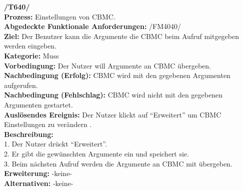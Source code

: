 \documentclass[a4paper]{scrreprt}
\begin{document}
\textbf{/T640/}\\
\textbf{Prozess:} Einstellungen von CBMC.\\
\textbf{Abgedeckte Funktionale Anforderungen:} /FM4040/ \\
\textbf{Ziel:} Der Benutzer kann die Argumente die CBMC beim Aufruf
mitgegeben werden eingeben.\\
\textbf{Kategorie:} Muss\\
\textbf{Vorbedingung:} Der Nutzer will Argumente an CBMC übergeben.\\
\textbf{Nachbedingung (Erfolg):} CBMC wird mit den gegebenen Argumenten
aufgerufen.\\
\textbf{Nachbedingung (Fehlschlag):} CBMC wird nicht mit den gegebenen
Argumenten gestartet.\\
\textbf{Auslösendes Ereignis:} Der Nutzer klickt auf "`Erweitert"' um CBMC Einstellungen zu verändern .\\
\textbf{Beschreibung:} \\
1. Der Nutzer drückt "`Erweitert"'.\\
2. Er gibt die gewünschten Argumente ein und speichert sie.\\
3. Beim nächsten Aufruf werden die Argumente an CBMC mit übergeben.\\
\textbf {Erweiterung:}  -keine- \\
\textbf {Alternativen:} -keine- \\ \\
\end{document}
